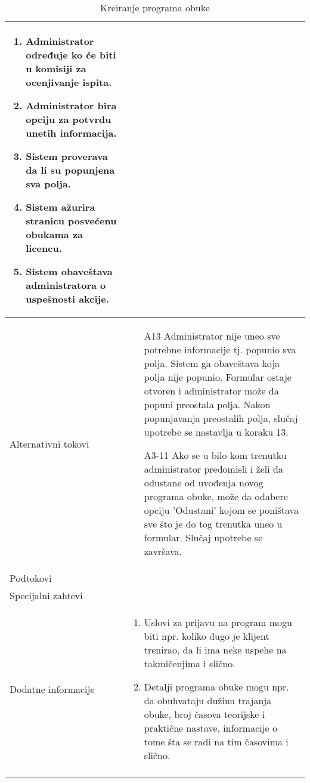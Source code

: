 \documentclass[../../main.tex]{subfiles}
\begin{document}
\begin{longtable}{| p{} | p{} |}
\begin{enumerate}
        \item Administrator određuje ko će biti u komisiji za ocenjivanje ispita.
        \item Administrator bira opciju za potvrdu unetih informacija.
        \item Sistem proverava da li su popunjena sva polja.
        \item Sistem ažurira stranicu posvećenu obukama za licencu.
        \item Sistem obaveštava administratora o uspešnosti akcije.
    \end{enumerate}\\
\hline
    Alternativni tokovi & 
    \begin{itemize}
        \item[A13] Administrator nije uneo sve potrebne informacije tj. popunio sva polja. Sistem ga obaveštava koja polja nije popunio. Formular ostaje otvoren i administrator može da popuni preostala polja. Nakon popunjavanja preostalih polja, slučaj upotrebe se nastavlja u koraku 13.
        \item[A3-11] Ako se u bilo kom trenutku administrator predomisli i želi da odustane od uvođenja novog programa obuke, može da odabere opciju 'Odustani' kojom se poništava sve što je do tog trenutka uneo u formular. Slučaj upotrebe se završava.
    \end{itemize} \\
\hline
    Podtokovi & \\
\hline
    Specijalni zahtevi & \\
\hline
    Dodatne informacije &
    \begin{enumerate}
        \item Uslovi za prijavu na program mogu biti npr. koliko dugo je klijent trenirao, da li ima neke uspehe na takmičenjima i slično. 
        \item Detalji programa obuke mogu npr. da obuhvataju dužinu trajanja obuke, broj časova teorijske i praktične nastave, informacije o tome šta se radi na tim časovima i slično.
    \end{enumerate}\\
\hline
\caption{Kreiranje programa obuke}
\end{longtable}
\end{document}
